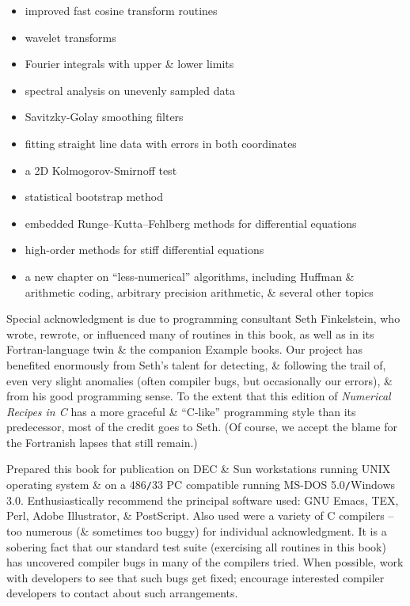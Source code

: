 \documentclass{article}
\begin{document}
\begin{enumerate}
\begin{itemize}
		\item improved fast cosine transform routines
		\item wavelet transforms
		\item Fourier integrals with upper \& lower limits
		\item spectral analysis on unevenly sampled data
		\item Savitzky-Golay smoothing filters
		\item fitting straight line data with errors in both coordinates
		\item a 2D Kolmogorov-Smirnoff test
		\item statistical bootstrap method
		\item embedded Runge--Kutta--Fehlberg methods for differential equations
		\item high-order methods for stiff differential equations
		\item a new chapter on ``less-numerical'' algorithms, including Huffman \& arithmetic coding, arbitrary precision arithmetic, \& several other topics
	\end{itemize}
	Special acknowledgment is due to programming consultant {\sc Seth Finkelstein}, who wrote, rewrote, or influenced many of routines in this book, as well as in its Fortran-language twin \& the companion Example books. Our project has benefited enormously from {\sc Seth}'s talent for detecting, \& following the trail of, even very slight anomalies (often compiler bugs, but occasionally our errors), \& from his good programming sense. To the extent that this edition of {\it Numerical Recipes in C} has a more graceful \& ``C-like'' programming style than its predecessor, most of the credit goes to {\sc Seth}. (Of course, we accept the blame for the Fortranish lapses that still remain.)
	
	Prepared this book for publication on DEC \& Sun workstations running UNIX operating system \& on a 486{\tt/}33 PC compatible running MS-DOS 5.0{\tt/}Windows 3.0. Enthusiastically recommend the principal software used: GNU Emacs, TEX, Perl, Adobe Illustrator, \& PostScript. Also used were a variety of C compilers -- too numerous (\& sometimes too buggy) for individual acknowledgment. It is a sobering fact that our standard test suite (exercising all routines in this book) has uncovered compiler bugs in many of the compilers tried. When possible, work with developers to see that such bugs get fixed; encourage interested compiler developers to contact about such arrangements.


\end{enumerate}
\end{document}
